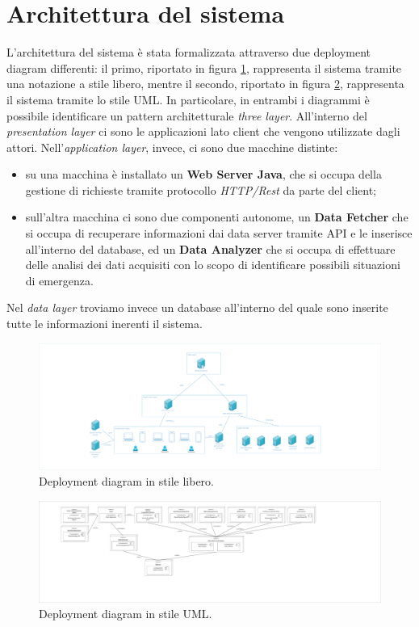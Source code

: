 \clearpage
\section{Architettura del sistema}
L'architettura del sistema è stata formalizzata attraverso due deployment diagram differenti: il primo, riportato in figura \ref{fig:DeplymnetDiagramNonFormale}, rappresenta il sistema tramite una notazione a stile libero, mentre il secondo, riportato in figura \ref{fig:DeplymnetDiagramFormale}, rappresenta il sistema tramite lo stile UML. In particolare, in entrambi i diagrammi è possibile identificare un pattern architetturale \textit{three layer}. All'interno del \textit{presentation layer} ci sono le applicazioni lato client che vengono utilizzate dagli attori. Nell'\textit{application layer}, invece, ci sono due macchine distinte:

\begin{itemize}
	\item su una macchina è installato un \textbf{Web Server Java}, che si occupa della gestione di richieste tramite protocollo \textit{HTTP/Rest} da parte del client;
	\item sull'altra macchina ci sono due componenti autonome, un \textbf{Data Fetcher} che si occupa di recuperare informazioni dai data server tramite API e le inserisce all'interno del database, ed un \textbf{Data Analyzer} che si occupa di effettuare delle analisi dei dati acquisiti con lo scopo di identificare possibili situazioni di emergenza.
\end{itemize}

Nel \textit{data layer} troviamo invece un database all'interno del quale sono inserite tutte le informazioni inerenti il sistema.

\begin{figure}
	\centering
	\includegraphics[width=0.9\linewidth]{./Iterazione 0/OtherFiles/DeploymentDiagramNonFormale}
	\caption{Deployment diagram in stile libero.}
	\label{fig:DeplymnetDiagramNonFormale}
\end{figure}

\begin{figure}
	\centering
	\includegraphics[width=0.9\linewidth]{./Iterazione 0/OtherFiles/DeplymentDiagramFormale}
	\caption{Deployment diagram in stile UML.}
	\label{fig:DeplymnetDiagramFormale}
\end{figure}

